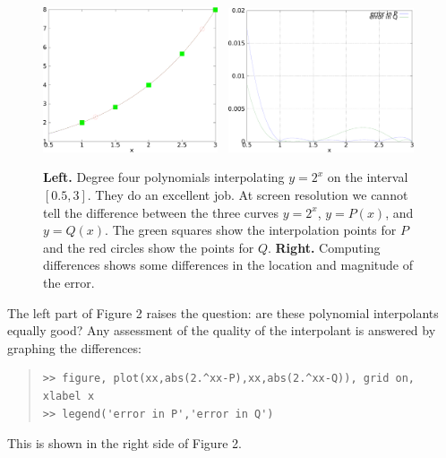 \documentclass[11pt]{amsart}
\begin{document}
\begin{figure}[ht]
\includegraphics[width=0.46\textwidth]{smoothpolyapprox} \, \includegraphics[width=0.49\textwidth]{clearpolyerror}
\caption{\textbf{Left.}  Degree four polynomials interpolating $y=2^x$ on the interval $[0.5,3]$.  They do an excellent job.  At screen resolution we cannot tell the difference between the three curves $y=2^x$, $y=P(x)$, and $y=Q(x)$.  The green squares show the interpolation points for $P$ and the red circles show the points for $Q$.  \textbf{Right.} Computing differences shows some differences in the location and magnitude of the error.}
\end{figure}

The left part of Figure 2 raises the question: are these polynomial interpolants equally good?  Any assessment of the quality of the interpolant is answered by graphing the differences:
\small\begin{quote}\begin{Verbatim}
>> figure, plot(xx,abs(2.^xx-P),xx,abs(2.^xx-Q)), grid on, xlabel x
>> legend('error in P','error in Q')
\end{Verbatim}
\end{quote}\normalsize
This is shown in the right side of Figure 2.
\end{document}
